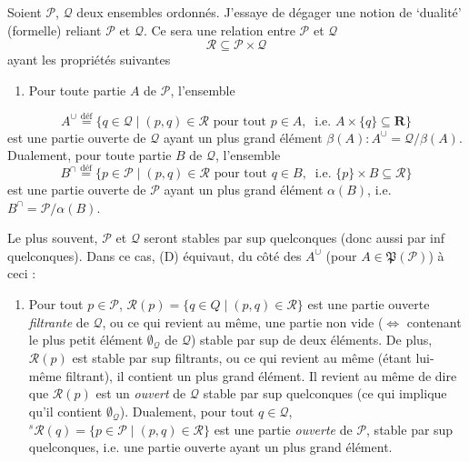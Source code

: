 \documentclass[11pt]{article}
\def\dcprintedpending{}
\newcommand{\msp}[1]{\marginpar{\footnotesize\raggedright
  \ifx\dcprintedpending\empty\else p.~\dcprintedpending\par\fi
  [#1]}\gdef\dcprintedpending{}}
\begin{document}
Soient $\mathcal{P}$, $\mathcal{Q}$ deux ensembles ordonnés. J'essaye de dégager une notion de `dualité' (formelle) reliant $\mathcal{P}$ et $\mathcal{Q}$. Ce sera une relation entre $\mathcal{P}$ et $\mathcal{Q}$
\[
\mathcal{R} \subseteq \mathcal{P} \times \mathcal{Q}
\tag*{(5.1)}
\]
ayant les propriétés suivantes
\begin{enumerate}[leftmargin=*, labelindent=0.5em]
\item[(D)] Pour toute partie $A$ de $\mathcal{P}$, l'ensemble
\end{enumerate}
\[
A^\cup \overset{\text{déf}}{=} \{ q \in \mathcal{Q} \mid (p,q) \in \mathcal{R} \text{ pour tout } p \in A,\ \text{ i.e. } A \times \{q\} \subseteq \mathbf{R} \} %
\]
est une partie ouverte de $\mathcal{Q}$ ayant un plus grand élément $\beta(A) : A^\cup = \mathcal{Q}/\beta(A)$. Dualement, pour toute partie $B$ de $\mathcal{Q}$, l'ensemble
\[
B^\cap \overset{\text{déf}}{=} \{ p \in \mathcal{P} \mid (p,q) \in \mathcal{R} \text{ pour tout } q \in B,\ \text{ i.e. } \{p\} \times B \subseteq \mathcal{R} \}
\]
est une partie ouverte de $\mathcal{P}$ ayant un plus grand élément $\alpha(B)$, i.e. $B^\cap = \mathcal{P}/\alpha(B)$.

Le plus souvent, $\mathcal{P}$ et $\mathcal{Q}$ seront stables par sup quelconques (donc aussi par inf quelconques). Dans ce cas, (D) équivaut, du côté des $A^\cup$ (pour $A \in \mathfrak{P}(\mathcal{P})$) à ceci :
\begin{enumerate}[leftmargin=*, labelindent=0em]
\item[(D$_0$)] Pour tout $p \in \mathcal{P}$, $\mathcal{R}(p) = \{ q \in Q \mid (p,q) \in \mathcal{R} \}$ est une partie ouverte \textit{filtrante} de $\mathcal{Q}$, ou ce qui revient au même, une partie non vide ($\Longleftrightarrow$ contenant le plus petit élément $\emptyset_{\mathcal{Q}}$ de $\mathcal{Q}$) stable par sup de deux éléments. De plus, $\mathcal{R}(p)$ est stable par sup filtrants, ou ce qui revient au même (étant lui-même filtrant), il contient un plus grand élément. Il revient %
\msp{page 70}
au même de dire que $\mathcal{R}(p)$ est un \textit{ouvert} de $\mathcal{Q}$ stable par sup quelconques (ce qui implique qu'il contient $\emptyset_{\mathcal{Q}}$). Dualement, pour tout $q \in \mathcal{Q}$, ${}^{s}\mathcal{R}(q) = \{ p \in \mathcal{P} \mid (p,q) \in \mathcal{R} \}$ est une partie \textit{ouverte} de $\mathcal{P}$, stable par sup quelconques, i.e. une partie ouverte ayant un plus grand élément. %
\end{enumerate}
\end{document}
